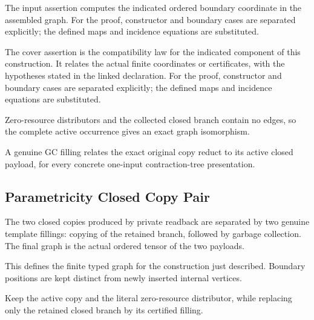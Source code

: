 The input assertion computes the indicated ordered boundary coordinate in the assembled graph.
For the proof, constructor and boundary cases are separated explicitly; the defined maps and incidence equations are substituted.
\par{}

The cover assertion is the compatibility law for the indicated component of this construction. It relates the actual finite coordinates or certificates, with the hypotheses stated in the linked declaration.
For the proof, constructor and boundary cases are separated explicitly; the defined maps and incidence equations are substituted.
\par{}

Zero-resource distributors and the collected closed branch contain no edges, so the complete active occurrence gives an exact graph isomorphism.
\par{}

A genuine GC filling relates the exact original copy reduct to its active closed payload, for every concrete one-input contraction-tree presentation.
\par{}

\subsection{Parametricity Closed Copy Pair}
The two closed copies produced by private readback are separated by two genuine template fillings: copying of the retained branch, followed by garbage collection. The final graph is the actual ordered tensor of the two payloads.

This defines the finite typed graph for the construction just described. Boundary positions are kept distinct from newly inserted internal vertices.
\par{}

Keep the active copy and the literal zero-resource distributor, while replacing only the retained closed branch by its certified filling.
\par{}

